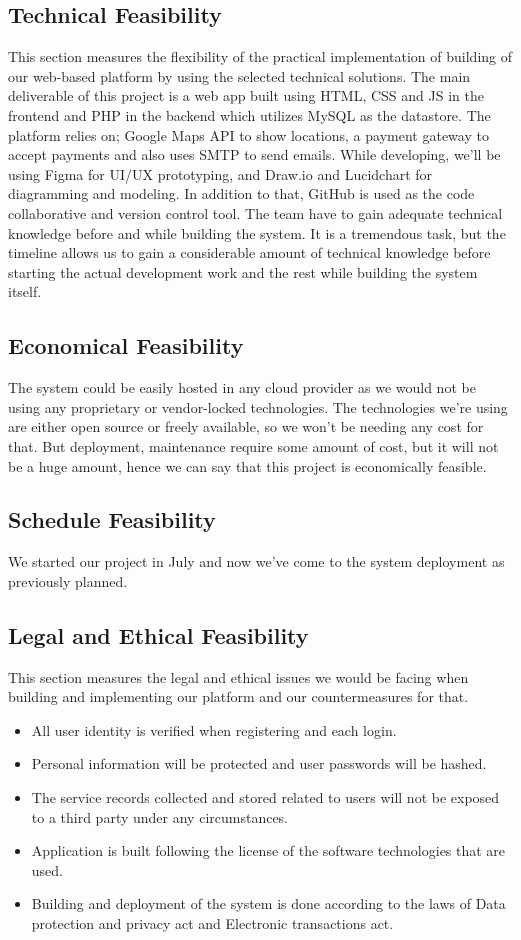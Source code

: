 \subsection{Technical Feasibility}
This section measures the flexibility of the practical implementation of building of our
web-based platform by using the selected technical solutions. The main deliverable of
this project is a web app built using HTML, CSS and JS in the frontend and PHP in the
backend which utilizes MySQL as the datastore. 
The platform relies on; Google Maps API to show locations, a payment gateway to accept payments and also uses SMTP to send
emails.
While developing, we’ll be using Figma for UI/UX prototyping, and Draw.io and Lucidchart for diagramming and modeling. In addition to that, GitHub is used as the code collaborative and version control tool.
The team have to gain adequate technical knowledge before and while building the system. It is a tremendous task, but the timeline allows us to gain a considerable amount of technical knowledge before starting the actual development work and the rest while
building the system itself.

\subsection{Economical Feasibility}
The system could be easily hosted in any cloud provider as we would not be using any
proprietary or vendor-locked technologies.
The technologies we’re using are either open source or freely available, so we won't be needing any cost for that. But deployment, maintenance require some amount of cost, but it will not be a huge amount, hence we can say that this project is economically feasible.

\subsection{Schedule Feasibility}
We started our project in July and now we've come to the system deployment as previously planned.

\subsection{Legal and Ethical Feasibility}
This section measures the legal and ethical issues we would be facing when building and implementing our platform and our countermeasures for that.
\begin{itemize}
    \item All user identity is verified when registering and each login.
    \item Personal information will be protected and user passwords will be hashed.
    \item The service records collected and stored related to users will not be exposed to a third party under any circumstances.
    \item Application is built following the license of the software technologies that are used.
    \item Building and deployment of the system is done according to the laws of Data protection and privacy act and Electronic transactions act.
\end{itemize}